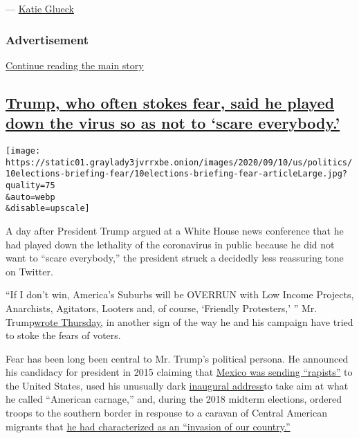 --- \href{https://www.nytimes3xbfgragh.onion/by/katie-glueck}{Katie
Glueck}

\hypertarget{advertisement}{%
\subsubsection{Advertisement}\label{advertisement}}

\protect\hyperlink{after-dfp-ad-mid1}{Continue reading the main story}

\hypertarget{trump-who-often-stokes-fear-said-he-played-down-the-virus-so-as-not-to-scare-everybody}{%
\subsection{\texorpdfstring{\protect\hyperlink{trump-who-often-stokes-fear-said-he-played-down-the-virus-so-as-not-to-scare-everybody}{Trump,
who often stokes fear, said he played down the virus so as not to `scare
everybody.'}}{Trump, who often stokes fear, said he played down the virus so as not to `scare everybody.'}}\label{trump-who-often-stokes-fear-said-he-played-down-the-virus-so-as-not-to-scare-everybody}}

\texttt{[image: https://static01.graylady3jvrrxbe.onion/images/2020/09/10/us/politics/10elections-briefing-fear/10elections-briefing-fear-articleLarge.jpg?quality=75\\\&auto=webp\\\&disable=upscale]}

A day after President Trump argued at a White House news conference that
he had played down the lethality of the coronavirus in public because he
did not want to ``scare everybody,'' the president struck a decidedly
less reassuring tone on Twitter.

``If I don't win, America's Suburbs will be OVERRUN with Low Income
Projects, Anarchists, Agitators, Looters and, of course, `Friendly
Protesters,' '' Mr.
Trump\href{https://twitter.com/realDonaldTrump/status/1304060630656311296?s=20}{wrote
Thursday,} in another sign of the way he and his campaign have tried to
stoke the fears of voters.

Fear has been long been central to Mr. Trump's political persona. He
announced his candidacy for president in 2015 claiming that
\href{https://www.nytimes3xbfgragh.onion/politics/first-draft/2015/06/16/choice-words-from-donald-trump-presidential-candidate/}{Mexico
was sending ``rapists''} to the United States, used his unusually dark
\href{https://www.nytimes3xbfgragh.onion/interactive/2017/01/20/us/politics/donald-trump-inauguration-speech-transcript.html}{inaugural
address}to take aim at what he called ``American carnage,'' and, during
the 2018 midterm elections, ordered troops to the southern border in
response to a caravan of Central American migrants that
\href{https://www.nytimes3xbfgragh.onion/2018/10/29/us/politics/border-security-troops-trump.html?login=smartlock\&auth=login-smartlock}{he
had characterized as an ``invasion of our country.''}

